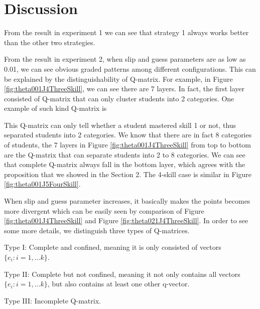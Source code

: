 \documentclass{edm_template}
\begin{document}
%  

\section{Discussion}
From the result in experiment 1 we can see that strategy 1 always works better than the other two strategies. 

From the result in experiment 2, when slip and guess parameters are as low as 0.01, we can see obvious graded patterns among different configurations. This can be explained by the distinguishability of Q-matrix. For example, in Figure \ref{fig:theta001J4ThreeSkill}, we can see there are 7 layers. In fact, the first layer consisted of Q-matrix that can only cluster students into 2 categories. One example of such kind Q-matrix is

This Q-matrix can only tell whether a student mastered skill 1 or not, thus separated students into 2 categories. We know that there are in fact 8 categories of students, the 7 layers in Figure \ref{fig:theta001J4ThreeSkill} from top to bottom are the Q-matrix that can separate students into 2 to 8 categories. We can see that complete Q-matrix always fall in the bottom layer, which agrees with the proposition that we showed in the Section 2. The 4-skill case is similar in Figure \ref{fig:theta001J5FourSkill}.

When slip and guess parameter increases, it basically makes the points becomes more divergent which can be easily seen by comparison of Figure \ref{fig:theta001J4ThreeSkill} and Figure \ref{fig:theta021J4ThreeSkill}. In order to see some more details, we distinguish three types of Q-matrices. 

Type I: Complete and confined, meaning it is only consisted of vectors $\{e_{i}:i=1,...k\}$.

Type II: Complete but not confined, meaning it not only contains all vectors $\{e_{i}:i=1,...k\}$, but also contains at least one other q-vector.

Type III: Incomplete Q-matrix.
\end{document}
